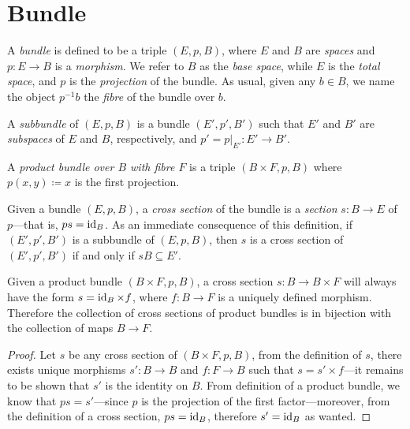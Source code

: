 \section{Bundle}

\begin{definition}[Bundle]
\label{def:bundle}
A \emph{bundle} is defined to be a triple \((E, p, B)\), where \(E\) and \(B\)
are \emph{spaces} and \(p: E \to B\) is a \emph{morphism}. We refer to \(B\) as
the \emph{base space}, while \(E\) is the \emph{total space}, and \(p\) is the
\emph{projection} of the bundle. As usual, given any \(b \in B\), we name the
object \(p^{-1} b\) the \emph{fibre} of the bundle over \(b\).

A \emph{subbundle} of \((E, p, B)\) is a bundle \((E', p', B')\) such that
\(E'\) and \(B'\) are \emph{subspaces} of \(E\) and \(B\), respectively, and
\(p' = p|_{E'}: E' \to B'\).
\end{definition}

\begin{definition}
\label{def:product-bundle}
A \emph{product bundle over \(B\) with fibre \(F\)} is a triple
\((B \times F, p, B)\) where \(p(x, y) \coloneq x\) is the first projection.
\end{definition}

\begin{definition}
\label{def:cross-section-bundle}
Given a bundle \((E, p, B)\), a \emph{cross section} of the bundle is a
\emph{section} \(s: B \to E\) of \(p\)---that is, \(p s = \operatorname{id}_B\). As
an immediate consequence of this definition, if \((E', p', B')\) is a subbundle
of \((E, p, B)\), then \(s\) is a cross section of \((E', p', B')\) if and only
if \(s B \subseteq E'\).
\end{definition}

\begin{lemma}
\label{lem:cross-section-of-product-bundle}
Given a product bundle \((B \times F, p, B)\), a cross section
\(s: B \to B \times F\) will always have the form \(s = \operatorname{id}_B \times f\), where
\(f: B \to F\) is a uniquely defined morphism. Therefore the collection of cross
sections of product bundles is in bijection with the collection of maps
\(B \to F\).
\end{lemma}

\begin{proof}
Let \(s\) be any cross section of \((B \times F, p, B)\), from the definition of
\(s\), there exists unique morphisms \(s': B \to B\) and \(f: F \to B\) such
that \(s = s' \times f\)---it remains to be shown that \(s'\) is the identity on
\(B\). From definition of a product bundle, we know that \(p s = s'\)---since
\(p\) is the projection of the first factor---moreover, from the definition of a
cross section, \(p s = \operatorname{id}_B\), therefore \(s' = \operatorname{id}_B\) as wanted.
\end{proof}

